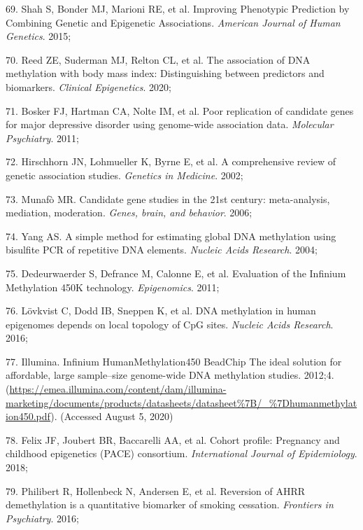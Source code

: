 \documentclass[11pt,twoside]{bristolthesis}
\newenvironment{cslreferences}%
  {}%
  {\par}
\begin{document}
\begin{cslreferences}
\leavevmode\hypertarget{ref-Shah2015}{}%
69. Shah S, Bonder MJ, Marioni RE, et al. Improving Phenotypic Prediction by Combining Genetic and Epigenetic Associations. \emph{American Journal of Human Genetics}. 2015;

\leavevmode\hypertarget{ref-Reed2020}{}%
70. Reed ZE, Suderman MJ, Relton CL, et al. The association of DNA methylation with body mass index: Distinguishing between predictors and biomarkers. \emph{Clinical Epigenetics}. 2020;

\leavevmode\hypertarget{ref-Bosker2011}{}%
71. Bosker FJ, Hartman CA, Nolte IM, et al. Poor replication of candidate genes for major depressive disorder using genome-wide association data. \emph{Molecular Psychiatry}. 2011;

\leavevmode\hypertarget{ref-Hirschhorn2002}{}%
72. Hirschhorn JN, Lohmueller K, Byrne E, et al. A comprehensive review of genetic association studies. \emph{Genetics in Medicine}. 2002;

\leavevmode\hypertarget{ref-Munafo2006}{}%
73. Munafò MR. Candidate gene studies in the 21st century: meta-analysis, mediation, moderation. \emph{Genes, brain, and behavior}. 2006;

\leavevmode\hypertarget{ref-Yang2004}{}%
74. Yang AS. A simple method for estimating global DNA methylation using bisulfite PCR of repetitive DNA elements. \emph{Nucleic Acids Research}. 2004;

\leavevmode\hypertarget{ref-Dedeurwaerder2011}{}%
75. Dedeurwaerder S, Defrance M, Calonne E, et al. Evaluation of the Infinium Methylation 450K technology. \emph{Epigenomics}. 2011;

\leavevmode\hypertarget{ref-Lovkvist2016}{}%
76. Lövkvist C, Dodd IB, Sneppen K, et al. DNA methylation in human epigenomes depends on local topology of CpG sites. \emph{Nucleic Acids Research}. 2016;

\leavevmode\hypertarget{ref-Illumina2012}{}%
77. Illumina. Infinium HumanMethylation450 BeadChip The ideal solution for affordable, large sample--size genome-wide DNA methylation studies. 2012;4. (\url{https://emea.illumina.com/content/dam/illumina-marketing/documents/products/datasheets/datasheet\%7B/_\%7Dhumanmethylation450.pdf}). (Accessed August 5, 2020)

\leavevmode\hypertarget{ref-Felix2018}{}%
78. Felix JF, Joubert BR, Baccarelli AA, et al. Cohort profile: Pregnancy and childhood epigenetics (PACE) consortium. \emph{International Journal of Epidemiology}. 2018;

\leavevmode\hypertarget{ref-Philibert2016}{}%
79. Philibert R, Hollenbeck N, Andersen E, et al. Reversion of AHRR demethylation is a quantitative biomarker of smoking cessation. \emph{Frontiers in Psychiatry}. 2016;


\end{cslreferences}
\end{document}
